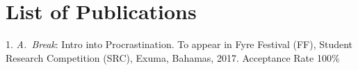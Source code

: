 \chapter{List of Publications}%
\label{chap:publications}


\begin{etaremune}{\small
\item[1.] \emph{A.\ Break}: Intro into Procrastination. To appear in Fyre Festival (FF), Student Research Competition (SRC), Exuma, Bahamas, 2017. Acceptance Rate 100\%
}\end{etaremune}
